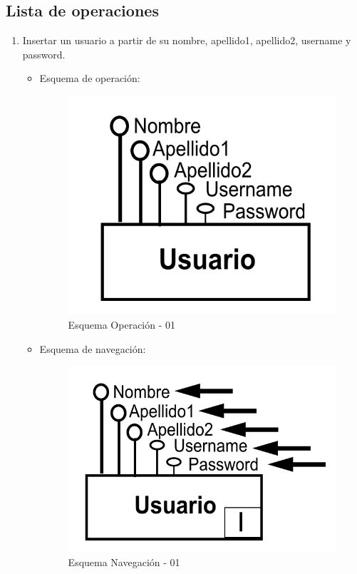 \documentclass[a4paper,12pt]{report}
\begin{document}
\subsection{Lista de operaciones}
\label{sec-7-8-1}
\begin{enumerate}
\item Insertar un usuario a partir de su nombre, apellido1, apellido2,
username y password.
\begin{itemize}
\item Esquema de operación:
\begin{figure}[!htp]
\centering
\includegraphics[width=0.9\linewidth]{./operaciones/img/Usuarios/01_ope.png}
\caption{Esquema Operación - 01}
\label{fig:ope01}
\medskip
\footnotesize
{}
\end{figure}
\item Esquema de navegación:
\begin{figure}[!htp]
\centering
\includegraphics[width=0.9\linewidth]{./operaciones/img/Usuarios/01_nav.png}
\caption{Esquema Navegación - 01}
\label{fig:nave01}
\medskip
\footnotesize
{}
\end{figure}
\end{itemize}


\end{enumerate}
\end{document}
